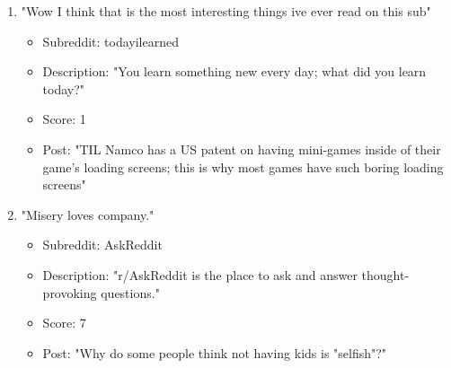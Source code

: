 \documentclass[a4paper,12pt]{article}
\begin{document}
\begin{enumerate}
	\item "Wow I think that is the most interesting things ive ever read on this sub"
	\begin{itemize}
		\item Subreddit: todayilearned
		\item Description: "You learn something new every day; what did you learn today?"
		\item Score: 1
		\item Post: "TIL Namco has a US patent on having mini-games inside of their game's loading screens; this is why most games have such boring loading screens"
	\end{itemize}

	\item "Misery loves company."
	\begin{itemize}
		\item Subreddit: AskReddit
		\item Description: "r/AskReddit is the place to ask and answer thought-provoking questions."
		\item Score: 7
		\item Post: "Why do some people think not having kids is "selfish"?"
	\end{itemize}
\end{enumerate}
\end{document}
